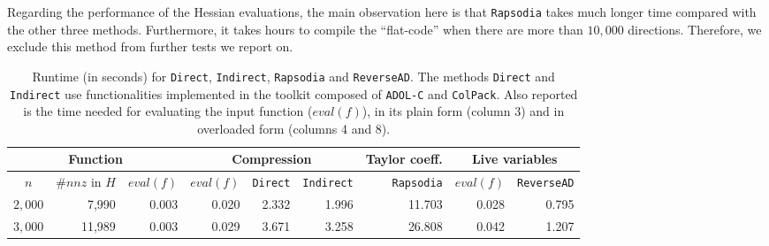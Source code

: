 \documentclass[10pt, a4paper, english]{article}
\begin{document}
Regarding the performance of the Hessian evaluations, the main observation here is that {\tt Rapsodia} takes much longer time compared with the other three methods. Furthermore, it takes hours to compile the ``flat-code'' when there are more than $10,000$ directions. 
Therefore, we exclude this method from further tests we report on.
\begin{table}[htbp]
\begin{center}
\begin{tabular}{ | c | r | r || r | r | r | r | r | r |}
\hline
\multicolumn{3}{|c||}{Function} & \multicolumn{3}{|c|}{{Compression}} & Taylor coeff.  & \multicolumn{2}{|c|}{Live variables} \\
\hline
$n$ & $\#nnz$ in $H$ & $eval(f)$ & $eval(f)$ &{\tt Direct} & {\tt Indirect} & {\tt Rapsodia} & $eval(f)$ & {\tt ReverseAD} \\
\hline
$2,000$ & 7,990 & 0.003& 0.020 & 2.332 & 1.996 & 11.703 & 0.028 & 0.795 \\
$3,000$ & 11,989 & 0.003 & 0.029 & 3.671 & 3.258 & 26.808 & 0.042 & 1.207\\
\hline 
\end{tabular}
\end{center}
\caption{Runtime (in seconds) for {\tt Direct}, {\tt Indirect}, {\tt Rapsodia} and {\tt ReverseAD}. The methods {\tt Direct} and {\tt Indirect} use functionalities implemented in the toolkit composed of {\tt ADOL-C} and {\tt ColPack}. Also reported is the time needed for evaluating the input function 
($eval(f)$), in its plain form (column 3) and in overloaded form (columns 4 and 8).} 
\label{tab:general}
\end{table}


\end{document}
